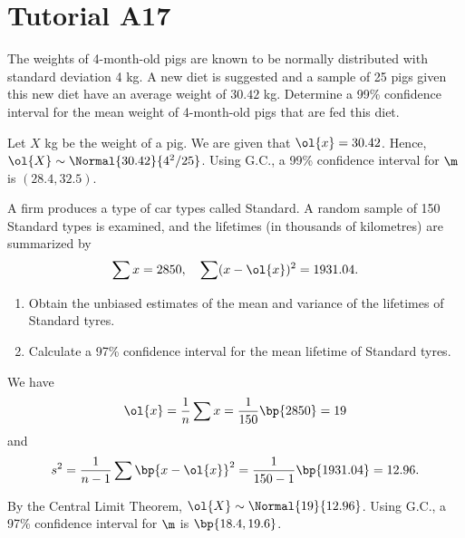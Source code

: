 \section{Tutorial A17}

\begin{problem}
    The weights of 4-month-old pigs are known to be normally distributed with standard deviation 4 kg. A new diet is suggested and a sample of 25 pigs given this new diet have an average weight of $30.42$ kg. Determine a 99\% confidence interval for the mean weight of 4-month-old pigs that are fed this diet.
\end{problem}
\begin{solution}
    Let $X$ kg be the weight of a pig. We are given that $\ol{x} = 30.42$. Hence, $\ol{X} \sim \Normal{30.42}{4^2/25}$. Using G.C., a 99\% confidence interval for $\m$ is $(28.4, 32.5)$.
\end{solution}

\begin{problem}
    A firm produces a type of car types called Standard. A random sample of 150 Standard types is examined, and the lifetimes (in thousands of kilometres) are summarized by \[\sum x = 2850, \quad \sum (x-\ol{x})^2 = 1931.04.\]

    \begin{enumerate}
        \item Obtain the unbiased estimates of the mean and variance of the lifetimes of Standard tyres.
        \item Calculate a 97\% confidence interval for the mean lifetime of Standard tyres.
    \end{enumerate}
\end{problem}
\begin{solution}
    \begin{ppart}
        We have \[\ol{x} = \frac1n \sum x = \frac1{150} \bp{2850} = 19\] and \[s^2 = \frac1{n-1} \sum \bp{x - \ol{x}}^2 = \frac1{150-1} \bp{1931.04} = 12.96.\]
    \end{ppart}
    \begin{ppart}
        By the Central Limit Theorem, $\ol{X} \sim \Normal{19}{12.96}$. Using G.C., a 97\% confidence interval for $\m$ is $\bp{18.4, 19.6}$.
    \end{ppart}
\end{solution}

